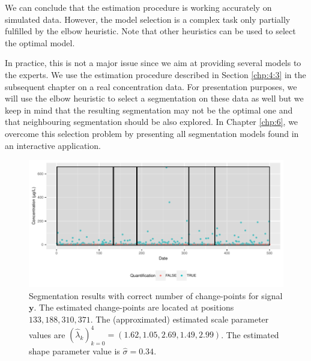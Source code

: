 We can conclude that the estimation procedure is working accurately on simulated data. However, the model selection is a complex task only partially fulfilled by the elbow heuristic. Note that other heuristics can be used to select the optimal model. 

In practice, this is not a major issue since we aim at providing several models to the experts. We use the estimation procedure described in Section \ref{chp:4:3} in the subsequent chapter on a real concentration data. For presentation purposes, we will use the elbow heuristic to select a segmentation on these data as well but we keep in mind that the resulting segmentation may not be the optimal one and that neighbouring segmentation should be also explored. In Chapter \ref{chp:6}, we overcome this selection problem by presenting all segmentation models found in an interactive application. 


\begin{figure}[htbp]
    \centering
    \includegraphics{figs/Chap4/y_sim_detect.pdf}
    \caption{Segmentation results with correct number of change-points for signal $\bm y$. The estimated change-points are located at positions $133,188,310,371$. The (approximated) estimated scale parameter values are $(\widehat{\lambda}_k)_{k=0}^4 = (1.62,1.05,2.69,1.49,2.99)$. The estimated shape parameter value is $\widehat{\sigma} = 0.34$.}
    \label{fig:detect_sim_y}
\end{figure}

